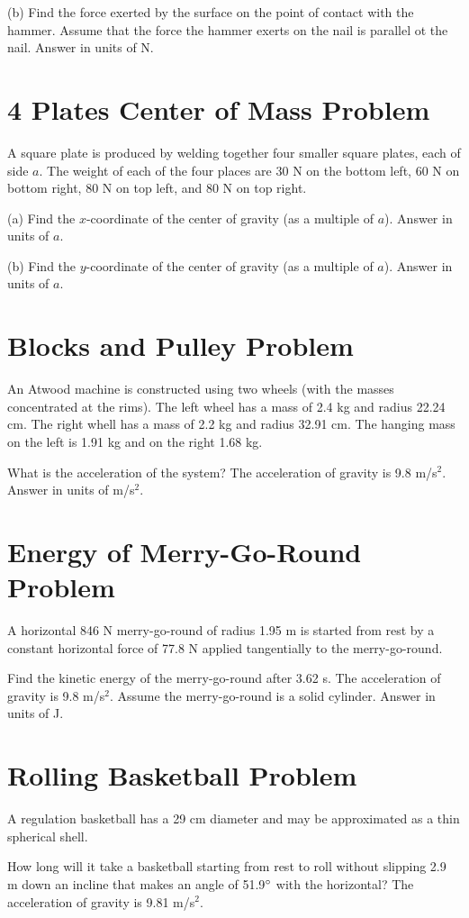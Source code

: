 \documentclass[../physics12.tex]{subfiles}
\begin{document}
(b) Find the force exerted by the surface on the point of contact with the hammer. Assume that the force the hammer exerts on the nail is parallel ot the nail.
Answer in units of N.

\section{4 Plates Center of Mass Problem}
A square plate is produced by welding together four smaller square plates, each of side $a$.
The weight of each of the four places are 30 N on the bottom left, 60 N on bottom right, 80 N on top left, and 80 N on top right.

(a) Find the $x$-coordinate of the center of gravity (as a multiple of $a$).
Answer in units of $a$.

(b) Find the $y$-coordinate of the center of gravity (as a multiple of $a$).
Answer in units of $a$.

\section{Blocks and Pulley Problem}
An Atwood machine is constructed using two wheels (with the masses concentrated at the rims). The left wheel has a mass of 2.4 kg and radius 22.24 cm.
The right whell has a mass of 2.2 kg and radius 32.91 cm. The hanging mass on the left is 1.91 kg and on the right 1.68 kg.

What is the acceleration of the system? The acceleration of gravity is 9.8 m/s$^2$.
Answer in units of m/s$^2$.

\section{Energy of Merry-Go-Round Problem}
A horizontal 846 N merry-go-round of radius 1.95 m is started from rest by a constant horizontal force of 77.8 N applied tangentially to the merry-go-round.

Find the kinetic energy of the merry-go-round after 3.62 s. The acceleration of gravity is 9.8 m/s$^2$. Assume the merry-go-round is a solid cylinder.
Answer in units of J.

\section{Rolling Basketball Problem}
A regulation basketball has a 29 cm diameter and may be approximated as a thin spherical shell.

How long will it take a basketball starting from rest to roll without slipping 2.9 m down an incline that makes an angle of 51.9$\degree$ with the horizontal?
The acceleration of gravity is 9.81 m/s$^2$.
\end{document}
